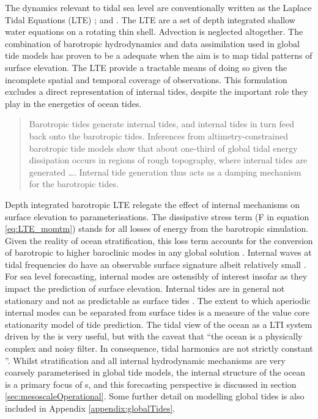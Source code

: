 The dynamics relevant to tidal sea level are conventionally written as the Laplace Tidal Equations (LTE) ; \citep[9.8]{gill1982atmosphere} and \citep{Hendershott:1981ub}.  The LTE are a set of depth integrated shallow water equations on a rotating thin shell.  Advection is neglected altogether.
The combination of barotropic hydrodynamics and data assimilation used in global tide models has proven to be a adequate when the aim is to map tidal patterns of surface elevation.  The LTE provide a tractable means of doing so given the incomplete spatial and temporal coverage of observations.
This formulation excludes a direct representation of internal tides, despite the important role they play in the energetics of ocean tides.
\begin{quote}
    Barotropic tides generate internal tides, and internal tides in turn feed back onto the barotropic tides. Inferences from altimetry-constrained barotropic tide models show that about one-third of global tidal energy dissipation occurs in regions of rough topography, where internal tides are generated \dots{}. Internal tide generation thus acts as a damping mechanism for the barotropic tides.\citep[pp22]{Arbic:hy}
\end{quote}
Depth integrated barotropic LTE relegate the effect of internal mechanisms on surface elevation to parameterisations.  The dissipative stress term (F in equation \ref{eq:LTE_momtm}) stands for all losses of energy from the barotropic simulation.  Given the reality of ocean stratification, this loss term accounts for the conversion of barotropic to higher baroclinic modes in any global solution \citep[pp121] {gill1982atmosphere}.
Internal waves at tidal frequencies do have an observable surface signature albeit relatively small \citep{Ray:2011tj}.  
For sea level forecasting, internal modes are ostensibly of interest insofar as they impact the prediction of surface elevation.  
Internal tides are in general not stationary and not as predictable as surface tides \citep{Nash:2012}.  The extent to which aperiodic internal modes can be separated from surface tides is a measure of the value core stationarity model of  tide prediction.
The tidal view of the ocean as a LTI system driven by the \ATGP{} is very useful, but with the caveat that ``the ocean is a physically complex and noisy filter.  In consequence, tidal harmonics are not strictly constant \citep[197]{Ray:2010jm}''.  
Whilst stratification and all internal hydrodynamic mechanisms are very coarsely parameterised in global tide models, the internal structure of the ocean is a primary focus of \OGCM{}s, and this forecasting perspective is discussed in section \ref{sec:mesoscaleOperational}.  Some further detail on modelling global tides is also included in Appendix \ref{appendix:globalTides}.


